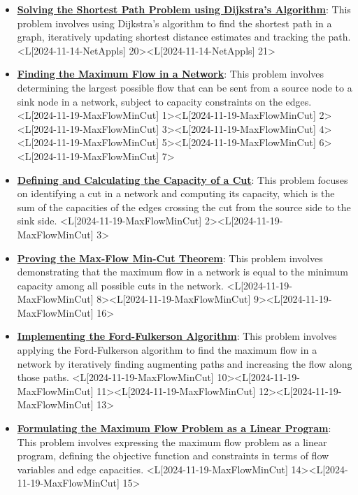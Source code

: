 \documentclass{article}%
\begin{document}
\begin{itemize}[[leftmargin=*]]
\item \href{https://www.math.purdue.edu/~yipn/421/2024-11-14-NetAppls.pdf#page=20}{\textbf{Solving the Shortest Path Problem using Dijkstra's Algorithm}}: This problem involves using Dijkstra's algorithm to find the shortest path in a graph, iteratively updating shortest distance estimates and tracking the path. <L[2024-11-14-NetAppls] 20><L[2024-11-14-NetAppls] 21>%
\end{itemize}%
\begin{itemize}[[leftmargin=*]]%
\item \href{https://www.math.purdue.edu/~yipn/421/2024-11-19-MaxFlowMinCut.pdf#page=1}{\textbf{Finding the Maximum Flow in a Network}}: This problem involves determining the largest possible flow that can be sent from a source node to a sink node in a network, subject to capacity constraints on the edges. <L[2024-11-19-MaxFlowMinCut] 1><L[2024-11-19-MaxFlowMinCut] 2><L[2024-11-19-MaxFlowMinCut] 3><L[2024-11-19-MaxFlowMinCut] 4><L[2024-11-19-MaxFlowMinCut] 5><L[2024-11-19-MaxFlowMinCut] 6><L[2024-11-19-MaxFlowMinCut] 7>%
\item \href{https://www.math.purdue.edu/~yipn/421/2024-11-19-MaxFlowMinCut.pdf#page=2}{\textbf{Defining and Calculating the Capacity of a Cut}}: This problem focuses on identifying a cut in a network and computing its capacity, which is the sum of the capacities of the edges crossing the cut from the source side to the sink side. <L[2024-11-19-MaxFlowMinCut] 2><L[2024-11-19-MaxFlowMinCut] 3>%
\item \href{https://www.math.purdue.edu/~yipn/421/2024-11-19-MaxFlowMinCut.pdf#page=8}{\textbf{Proving the Max{-}Flow Min{-}Cut Theorem}}: This problem involves demonstrating that the maximum flow in a network is equal to the minimum capacity among all possible cuts in the network. <L[2024-11-19-MaxFlowMinCut] 8><L[2024-11-19-MaxFlowMinCut] 9><L[2024-11-19-MaxFlowMinCut] 16>%
\item \href{https://www.math.purdue.edu/~yipn/421/2024-11-19-MaxFlowMinCut.pdf#page=10}{\textbf{Implementing the Ford{-}Fulkerson Algorithm}}: This problem involves applying the Ford-Fulkerson algorithm to find the maximum flow in a network by iteratively finding augmenting paths and increasing the flow along those paths. <L[2024-11-19-MaxFlowMinCut] 10><L[2024-11-19-MaxFlowMinCut] 11><L[2024-11-19-MaxFlowMinCut] 12><L[2024-11-19-MaxFlowMinCut] 13>%
\item \href{https://www.math.purdue.edu/~yipn/421/2024-11-19-MaxFlowMinCut.pdf#page=14}{\textbf{Formulating the Maximum Flow Problem as a Linear Program}}: This problem involves expressing the maximum flow problem as a linear program, defining the objective function and constraints in terms of flow variables and edge capacities. <L[2024-11-19-MaxFlowMinCut] 14><L[2024-11-19-MaxFlowMinCut] 15>%
\end{itemize}%
\end{document}
